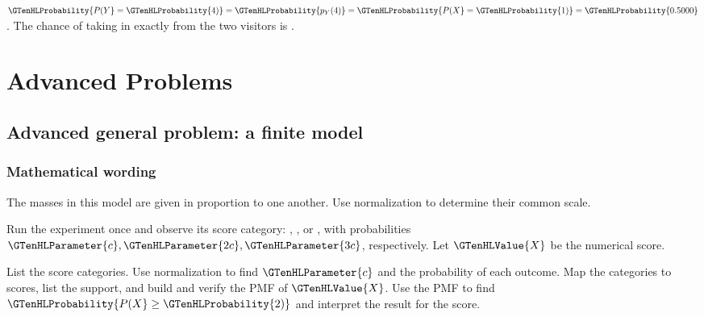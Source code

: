 $\GTenHLProbability{P(Y}=\GTenHLProbability{4)}=\GTenHLProbability{p_{Y}(4)}=\GTenHLProbability{P(X}=\GTenHLProbability{1)}=\GTenHLProbability{0.5000}$. The chance of taking in exactly  from the two visitors is .


\section{Advanced Problems}\label{sec:t2-c1-advanced}


\subsection{Advanced general problem: a finite model}
\label{subsec:t2-c1-advanced-general-problem-a-finite-model}
\subsubsection*{Mathematical wording}
The masses in this model are given in proportion to one another. Use normalization to determine their common scale.

Run the experiment once and observe its score category: , , or , with probabilities $\GTenHLParameter{c},\GTenHLParameter{2c},\GTenHLParameter{3c}$, respectively. Let $\GTenHLValue{X}$ be the numerical score.

    {List the score categories. Use normalization to find $\GTenHLParameter{c}$ and the probability of each outcome.}
    {Map the categories to scores, list the support, and build and verify the PMF of $\GTenHLValue{X}$.}
    {Use the PMF to find $\GTenHLProbability{P(X}\geq\GTenHLProbability{2)}$ and interpret the result for the score.}


